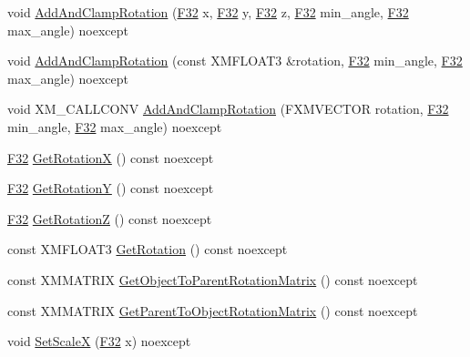 \begin{DoxyCompactItemize}
\item 
void \hyperlink{structmage_1_1_transform_a7d71b079115dcfae2747191f786713e1}{Add\+And\+Clamp\+Rotation} (\hyperlink{namespacemage_aa97e833b45f06d60a0a9c4fc22ae02c0}{F32} x, \hyperlink{namespacemage_aa97e833b45f06d60a0a9c4fc22ae02c0}{F32} y, \hyperlink{namespacemage_aa97e833b45f06d60a0a9c4fc22ae02c0}{F32} z, \hyperlink{namespacemage_aa97e833b45f06d60a0a9c4fc22ae02c0}{F32} min\+\_\+angle, \hyperlink{namespacemage_aa97e833b45f06d60a0a9c4fc22ae02c0}{F32} max\+\_\+angle) noexcept
\item 
void \hyperlink{structmage_1_1_transform_a972b964a5c9ed45b6ce8e024fd18383a}{Add\+And\+Clamp\+Rotation} (const X\+M\+F\+L\+O\+A\+T3 \&rotation, \hyperlink{namespacemage_aa97e833b45f06d60a0a9c4fc22ae02c0}{F32} min\+\_\+angle, \hyperlink{namespacemage_aa97e833b45f06d60a0a9c4fc22ae02c0}{F32} max\+\_\+angle) noexcept
\item 
void X\+M\+\_\+\+C\+A\+L\+L\+C\+O\+NV \hyperlink{structmage_1_1_transform_a1d202399e423a66a7dfd773b86f42b40}{Add\+And\+Clamp\+Rotation} (F\+X\+M\+V\+E\+C\+T\+OR rotation, \hyperlink{namespacemage_aa97e833b45f06d60a0a9c4fc22ae02c0}{F32} min\+\_\+angle, \hyperlink{namespacemage_aa97e833b45f06d60a0a9c4fc22ae02c0}{F32} max\+\_\+angle) noexcept
\item 
\hyperlink{namespacemage_aa97e833b45f06d60a0a9c4fc22ae02c0}{F32} \hyperlink{structmage_1_1_transform_ad3e1b49ccac234303ff28c8aea6f8e4a}{Get\+RotationX} () const noexcept
\item 
\hyperlink{namespacemage_aa97e833b45f06d60a0a9c4fc22ae02c0}{F32} \hyperlink{structmage_1_1_transform_ac1962d03093b3671fcfb6a9b4f410628}{Get\+RotationY} () const noexcept
\item 
\hyperlink{namespacemage_aa97e833b45f06d60a0a9c4fc22ae02c0}{F32} \hyperlink{structmage_1_1_transform_a1c2ae96eb6c0d33afd406ca1685b74f5}{Get\+RotationZ} () const noexcept
\item 
const X\+M\+F\+L\+O\+A\+T3 \hyperlink{structmage_1_1_transform_a4e133167aaded2194cb16eaa30ace40b}{Get\+Rotation} () const noexcept
\item 
const X\+M\+M\+A\+T\+R\+IX \hyperlink{structmage_1_1_transform_a33204680aad4ec80d99e1f3747a0ee2b}{Get\+Object\+To\+Parent\+Rotation\+Matrix} () const noexcept
\item 
const X\+M\+M\+A\+T\+R\+IX \hyperlink{structmage_1_1_transform_a6aa076600f336e6635204a22abcdea69}{Get\+Parent\+To\+Object\+Rotation\+Matrix} () const noexcept
\item 
void \hyperlink{structmage_1_1_transform_a6adbe2205f8db80107a2046eb7a9566a}{Set\+ScaleX} (\hyperlink{namespacemage_aa97e833b45f06d60a0a9c4fc22ae02c0}{F32} x) noexcept

\end{DoxyCompactItemize}
